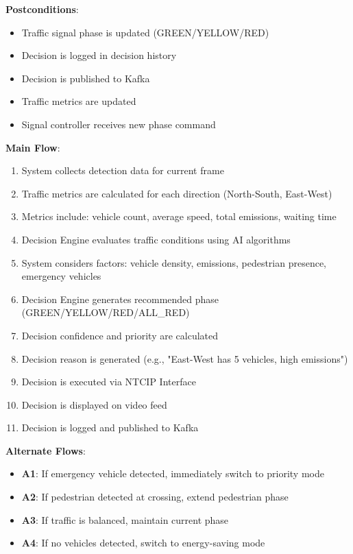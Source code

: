 \documentclass[12pt,a4paper]{article}
\begin{document}
\textbf{Postconditions}:
\begin{itemize}
    \item Traffic signal phase is updated (GREEN/YELLOW/RED)
    \item Decision is logged in decision history
    \item Decision is published to Kafka
    \item Traffic metrics are updated
    \item Signal controller receives new phase command
\end{itemize}

\textbf{Main Flow}:
\begin{enumerate}
    \item System collects detection data for current frame
    \item Traffic metrics are calculated for each direction (North-South, East-West)
    \item Metrics include: vehicle count, average speed, total emissions, waiting time
    \item Decision Engine evaluates traffic conditions using AI algorithms
    \item System considers factors: vehicle density, emissions, pedestrian presence, emergency vehicles
    \item Decision Engine generates recommended phase (GREEN/YELLOW/RED/ALL\_RED)
    \item Decision confidence and priority are calculated
    \item Decision reason is generated (e.g., "East-West has 5 vehicles, high emissions")
    \item Decision is executed via NTCIP Interface
    \item Decision is displayed on video feed
    \item Decision is logged and published to Kafka
\end{enumerate}

\textbf{Alternate Flows}:
\begin{itemize}
    \item \textbf{A1}: If emergency vehicle detected, immediately switch to priority mode
    \item \textbf{A2}: If pedestrian detected at crossing, extend pedestrian phase
    \item \textbf{A3}: If traffic is balanced, maintain current phase
    \item \textbf{A4}: If no vehicles detected, switch to energy-saving mode
\end{itemize}
\end{document}
